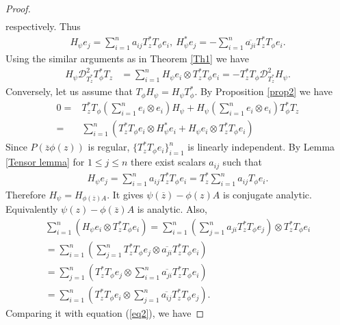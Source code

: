 \documentclass[12pt, reqno]{amsart}
\theoremstyle{definition}
\theoremstyle{remark}
\numberwithin{equation}{section}
\begin{document}
\begin{proof}
\begin{align*}
            \end{align*}
            respectively. Thus
            \begin{align*}
                H_\psi e_j = \sum_{i=1}^{n}a_{ij}T_z^*T_\phi e_i, ~H^*_\psi e_j=-\sum_{i=1}^{n}\overline{a_{ji}}T^*_zT_\phi e_i.
            \end{align*}
            Using the similar arguments as in Theorem \ref{Th1} we have
            \begin{align*}
               H_\psi \mathcal{D}^2_{T_z^*}T^*_\phi T_z&=\sum_{i=1}^{n} H_\psi e_i \otimes T^*_zT_\phi e_i=-T_z^*T_\phi \mathcal{D}^2_{T_z^*}H_\psi.
            \end{align*}
             Conversely, let us assume that $T_\phi H_\psi =H_\psi T^*_\phi$.
            By Proposition \ref{prop2} we have 
           \begin{align} 
               0=&T_z^*T_\phi (\sum_{i=1}^{n} e_i\otimes e_i) H_\psi +H_\psi (\sum_{i=1}^{n} e_i\otimes e_i) {T^*_\phi}T_z \nonumber\\
              =&\sum_{i=1}^{n} (T_z^*T_\phi e_i \otimes H^*_\psi e_i + H_\psi e_i \otimes T^*_zT_\phi e_i)\label{eq2}
           \end{align}
            Since $P(\overline z \phi(z))$ is regular, $\{T^*_zT_\phi e_i\}_{i=1}^{n}$ is linearly independent. By Lemma \ref{Tensor lemma} for $1\leq j \leq n$ there exist scalars $a_{ij}$ such that
            \begin{align*}
                H_\psi e_j = \sum_{i=1}^{n}a_{ij}T_z^*T_\phi e_i
                =T^*_z\sum_{i=1}^{n}a_{ij}T_\phi e_i.
            \end{align*}
            Therefore $H_\psi=H_{\phi(\overline{z})A}$. It gives $\psi(\overline{z})-\phi(z)A$ is conjugate analytic. Equivalently $\psi(z)-\phi(\overline z)A$ is analytic. Also,
            \begin{align*}
            \sum_{i=1}^{n} (H_\psi e_i \otimes T_z^*T_\phi e_i )=\sum_{i=1}^{n}(\sum_{j=1}^{n}a_{ji}T_z^*T_\phi e_j) \otimes T^*_zT_\phi e_i\\
            = \sum_{i=1}^{n}(\sum_{j=1}^{n}T_z^*T_\phi e_j \otimes \overline{a_{ji}}T^*_zT_\phi e_i)\\
            = \sum_{j=1}^{n}(T_z^*T_\phi e_j \otimes \sum_{i=1}^{n}\overline{a_{ji}}T^*_zT_\phi e_i)\\
             = \sum_{i=1}^{n}(T_z^*T_\phi e_i \otimes \sum_{j=1}^{n}\overline{a_{ij}}T^*_zT_\phi e_j).
            \end{align*}
            Comparing it with equation (\ref{eq2}), we have

\end{proof}
\end{document}
